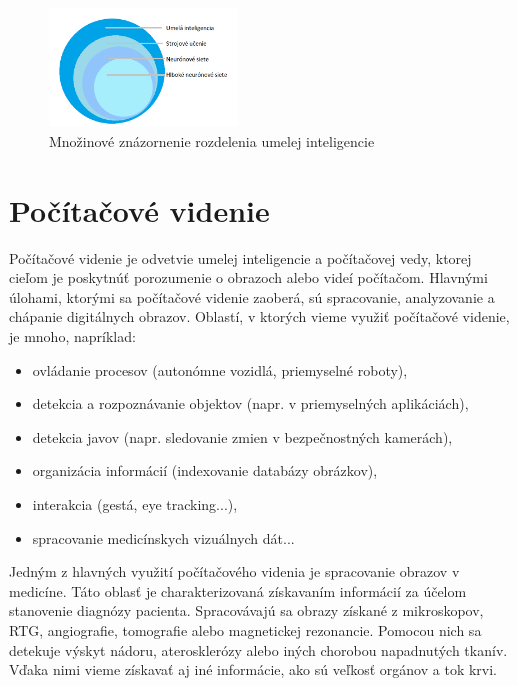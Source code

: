 \begin{figure}[h!]
\begin{centering}
\includegraphics[width=5cm]{assets/images/21_1c.png}
\par\end{centering}
\caption{Množinové znázornenie rozdelenia umelej inteligencie \label{fig:dynabook}}
\end{figure}


\section{Počítačové videnie}

\hspace{10mm}Počítačové videnie je odvetvie umelej inteligencie a počítačovej vedy, ktorej cieľom je poskytnúť porozumenie o obrazoch alebo videí počítačom. Hlavnými úlohami, ktorými sa počítačové videnie zaoberá, sú spracovanie, analyzovanie a chápanie digitálnych obrazov. Oblastí, v ktorých vieme využiť počítačové videnie, je mnoho, napríklad:  
\begin{itemize}
    \item ovládanie procesov (autonómne vozidlá, priemyselné roboty),
    \item detekcia a rozpoznávanie objektov (napr. v priemyselných aplikáciách),
    \item detekcia javov (napr. sledovanie zmien v bezpečnostných kamerách),
    \item organizácia informácií (indexovanie databázy obrázkov),
    \item interakcia (gestá, eye tracking...),
    \item spracovanie medicínskych vizuálnych dát...
\end{itemize}

\hspace{10mm}Jedným z hlavných využití počítačového videnia je spracovanie obrazov v medicíne. Táto oblasť je charakterizovaná získavaním informácií za účelom stanovenie diagnózy pacienta. Spracovávajú sa obrazy získané z mikroskopov, RTG, angiografie, tomografie alebo magnetickej rezonancie. Pomocou nich sa detekuje výskyt nádoru, aterosklerózy alebo iných chorobou napadnutých tkanív. Vďaka nimi vieme získavať aj iné informácie, ako sú veľkosť orgánov a tok krvi.

